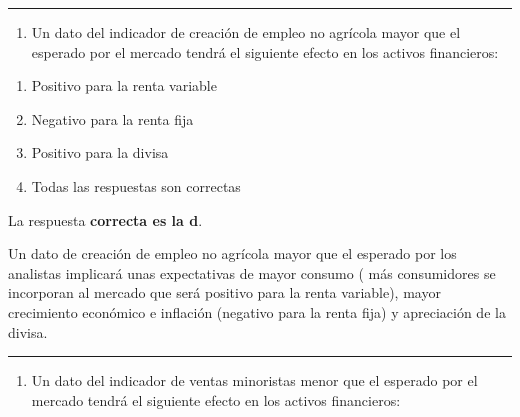 \documentclass[
  letterpaper,
  DIV=11,
  numbers=noendperiod]{scrreprt}
\providecommand{\tightlist}{%
  \setlength{\itemsep}{0pt}\setlength{\parskip}{0pt}}\usepackage{longtable,booktabs,array}
\begin{document}
\begin{center}\rule{0.5\linewidth}{0.5pt}\end{center}

\begin{enumerate}
\def\labelenumi{\arabic{enumi}.}
\setcounter{enumi}{37}
\tightlist
\item
  Un dato del indicador de creación de empleo no agrícola mayor que el
  esperado por el mercado tendrá el siguiente efecto en los activos
  financieros:
\end{enumerate}

\begin{enumerate}
\def\labelenumi{\alph{enumi})}
\item
  Positivo para la renta variable
\item
  Negativo para la renta fija
\item
  Positivo para la divisa
\item
  Todas las respuestas son correctas
\end{enumerate}

\begin{tcolorbox}[enhanced jigsaw, left=2mm, opacityback=0, colback=white, breakable, arc=.35mm, bottomrule=.15mm, rightrule=.15mm, toprule=.15mm, leftrule=.75mm, colframe=quarto-callout-tip-color-frame]
\begin{minipage}[t]{5.5mm}
\textcolor{quarto-callout-tip-color}{\faLightbulb}
\end{minipage}%
\begin{minipage}[t]{\textwidth - 5.5mm}

La respuesta \textbf{correcta es la d}.

Un dato de creación de empleo no agrícola mayor que el esperado por los
analistas implicará unas expectativas de mayor consumo ( más
consumidores se incorporan al mercado que será positivo para la renta
variable), mayor crecimiento económico e inflación (negativo para la
renta fija) y apreciación de la divisa.

\end{minipage}%
\end{tcolorbox}

\begin{center}\rule{0.5\linewidth}{0.5pt}\end{center}

\begin{enumerate}
\def\labelenumi{\arabic{enumi}.}
\setcounter{enumi}{38}
\tightlist
\item
  Un dato del indicador de ventas minoristas menor que el esperado por
  el mercado tendrá el siguiente efecto en los activos financieros:
\end{enumerate}
\end{document}

